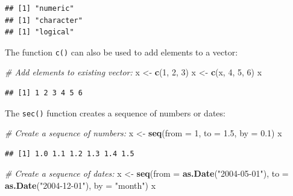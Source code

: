 \documentclass[
]{book}
\newenvironment{Shaded}{\begin{snugshade}}{\end{snugshade}}
\newcommand{\AttributeTok}[1]{\textcolor[rgb]{0.13,0.29,0.53}{#1}}
\newcommand{\CommentTok}[1]{\textcolor[rgb]{0.56,0.35,0.01}{\textit{#1}}}
\newcommand{\DecValTok}[1]{\textcolor[rgb]{0.00,0.00,0.81}{#1}}
\newcommand{\FloatTok}[1]{\textcolor[rgb]{0.00,0.00,0.81}{#1}}
\newcommand{\FunctionTok}[1]{\textcolor[rgb]{0.13,0.29,0.53}{\textbf{#1}}}
\newcommand{\NormalTok}[1]{#1}
\newcommand{\OtherTok}[1]{\textcolor[rgb]{0.56,0.35,0.01}{#1}}
\newcommand{\StringTok}[1]{\textcolor[rgb]{0.31,0.60,0.02}{#1}}
\begin{document}
\begin{verbatim}
## [1] "numeric"
## [1] "character"
## [1] "logical"
\end{verbatim}

The function \texttt{c()} can also be used to add elements to a vector:

\begin{Shaded}
\begin{Highlighting}[]
\CommentTok{\# Add elements to existing vector:}
\NormalTok{x }\OtherTok{\textless{}{-}} \FunctionTok{c}\NormalTok{(}\DecValTok{1}\NormalTok{, }\DecValTok{2}\NormalTok{, }\DecValTok{3}\NormalTok{)}
\NormalTok{x }\OtherTok{\textless{}{-}} \FunctionTok{c}\NormalTok{(x, }\DecValTok{4}\NormalTok{, }\DecValTok{5}\NormalTok{, }\DecValTok{6}\NormalTok{)}
\NormalTok{x}
\end{Highlighting}
\end{Shaded}

\begin{verbatim}
## [1] 1 2 3 4 5 6
\end{verbatim}

The \texttt{sec()} function creates a sequence of numbers or dates:

\begin{Shaded}
\begin{Highlighting}[]
\CommentTok{\# Create a sequence of numbers:}
\NormalTok{x }\OtherTok{\textless{}{-}} \FunctionTok{seq}\NormalTok{(}\AttributeTok{from =} \DecValTok{1}\NormalTok{, }\AttributeTok{to =} \FloatTok{1.5}\NormalTok{, }\AttributeTok{by =} \FloatTok{0.1}\NormalTok{)}
\NormalTok{x}
\end{Highlighting}
\end{Shaded}

\begin{verbatim}
## [1] 1.0 1.1 1.2 1.3 1.4 1.5
\end{verbatim}

\begin{Shaded}
\begin{Highlighting}[]
\CommentTok{\# Create a sequence of dates:}
\NormalTok{x }\OtherTok{\textless{}{-}} \FunctionTok{seq}\NormalTok{(}\AttributeTok{from =} \FunctionTok{as.Date}\NormalTok{(}\StringTok{"2004{-}05{-}01"}\NormalTok{), }\AttributeTok{to =} \FunctionTok{as.Date}\NormalTok{(}\StringTok{"2004{-}12{-}01"}\NormalTok{), }\AttributeTok{by =} \StringTok{"month"}\NormalTok{)}
\NormalTok{x}
\end{Highlighting}
\end{Shaded}
\end{document}
